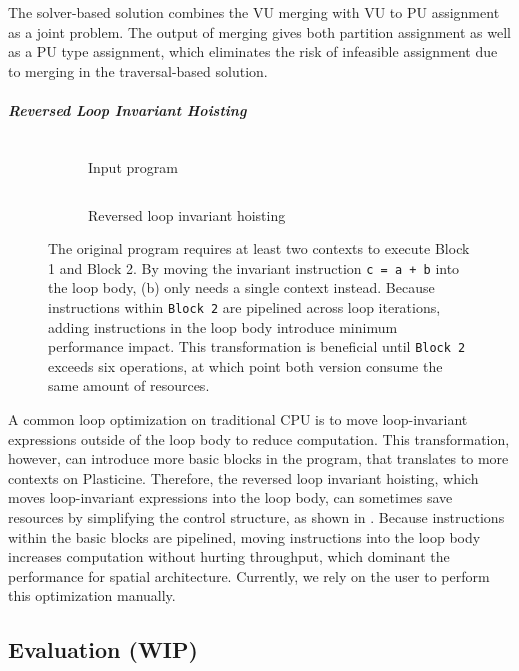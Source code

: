 The solver-based solution combines the VU merging with VU to PU assignment as a joint problem. 
The output of merging gives both partition assignment as well as a PU type assignment, which
eliminates the risk of infeasible assignment due to merging in the traversal-based solution.

\subparagraph{Reversed Loop Invariant Hoisting}

\begin{figure}
\centering
\hfill
\begin{subfigure}[b]{0.4\textwidth}
\inputminted{python}{code/hoisting.py}
\caption{Input program}
\end{subfigure}
\hfill
\begin{subfigure}[b]{0.4\textwidth}
\inputminted{python}{code/reversehoisting.py}
\caption{Reversed loop invariant hoisting}
\end{subfigure}
\hfill
\caption[Reversed loop invariant hoisting]{
  The original program requires at least two contexts to execute Block 1 and Block 2.
  By moving the invariant instruction \texttt{c = a + b} into the loop body, (b) only needs a single
  context instead. Because instructions within \texttt{Block 2} are pipelined across loop
  iterations, adding instructions in the loop body introduce minimum performance impact.
  This transformation is beneficial until \texttt{Block 2} exceeds six operations, at which point
  both version consume the same amount of resources.
}
\label{fig:reversehoisting}
\end{figure}

A common loop optimization on traditional CPU is to move loop-invariant expressions 
outside of the loop body to reduce computation. 
This transformation, however, can introduce more basic blocks in the program, that translates to
more contexts on Plasticine.
Therefore, the reversed loop invariant hoisting, which moves loop-invariant expressions into the loop body, can sometimes save resources by simplifying the control structure, as shown in 
.
Because instructions within the basic blocks are pipelined, 
moving instructions into the loop body increases computation without hurting throughput, which
dominant the performance for spatial architecture.
Currently, we rely on the user to perform this optimization manually.

\subsection{Evaluation (WIP)}

